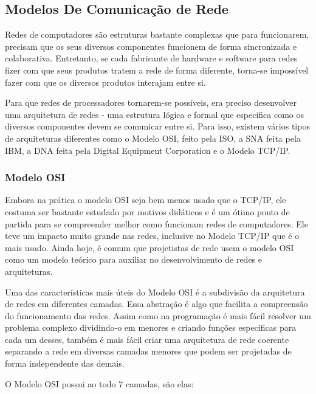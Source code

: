 	\subsection{Modelos De Comunicação de Rede}
	Redes de computadores são estruturas bastante complexas que para funcionarem, precisam que os seus diversos componentes funcionem de forma sincronizada e colaborativa. Entretanto, se cada fabricante de hardware e software para redes fizer com que seus produtos tratem a rede de forma diferente, torna-se impossível fazer com que os diversos produtos interajam entre si.
	
	Para que redes de processadores tornarem-se possíveis, era preciso desenvolver uma arquitetura de redes - uma estrutura lógica e formal que especifica como os diversos componentes devem se comunicar entre si. Para isso, existem vários tipos de arquiteturas diferentes como o Modelo OSI, feito pela ISO, a SNA feita pela IBM, a DNA feita pela Digital Equipment Corporation e o Modelo TCP/IP.

		\subsubsection{Modelo OSI}
			Embora na prática o modelo OSI seja bem menos usado que o TCP/IP, ele costuma ser bastante estudado por motivos didáticos e é um ótimo ponto de partida para se compreender melhor como funcionam redes de computadores. Ele teve um impacto muito grande nas redes, inclusive no Modelo TCP/IP que é o mais usado. Ainda hoje, é comum que projetistas de rede usem o modelo OSI como um modelo teórico para auxiliar no desenvolvimento de redes e arquiteturas.
			
			Uma das características mais úteis do Modelo OSI é a subdivisão da arquitetura de redes em diferentes camadas. Essa abstração é algo que facilita a compreensão do funcionamento das redes. Assim como na programação é mais fácil resolver um problema complexo dividindo-o em menores e criando funções específicas para cada um desses, também é mais fácil criar uma arquitetura de rede coerente separando a rede em diversas camadas menores que podem ser projetadas de forma independente das demais.
			
			O Modelo OSI possui ao todo 7 camadas, são elas:
			

